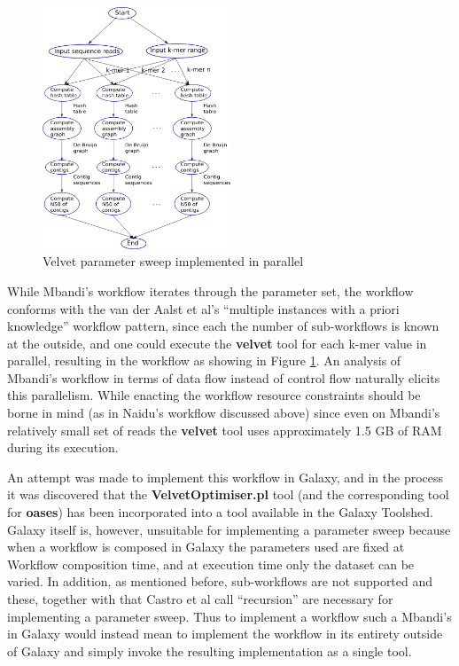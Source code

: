 \documentclass[a4paper,10pt]{scrreprt} \usepackage[utf8]{inputenc}
\begin{document}
\begin{figure}[!htb] \centering
\includegraphics[width=0.5\textwidth]{images/ComputeVelvetAlignments}
\caption{Velvet parameter sweep implemented in parallel}
\label{fig:ComputeVelvetAlignments}
\end{figure}

While Mbandi's workflow iterates through the parameter set, the workflow
conforms with the van der Aalst et al's ``multiple instances with a priori
knowledge'' workflow pattern, since each the number of sub-workflows is known at
the outside, and one could execute the \textbf{velvet} tool for each k-mer value
in parallel, resulting in the workflow as showing in Figure
\ref{fig:ComputeVelvetAlignments}. An analysis of Mbandi's workflow in terms of
data flow instead of control flow naturally elicits this parallelism. While
enacting the workflow resource constraints should be borne in mind (as in
Naidu's workflow discussed above) since even on Mbandi's relatively small set of
reads the \textbf{velvet} tool uses approximately 1.5 GB of RAM during its
execution.

An attempt was made to implement this workflow in Galaxy, and in the process it
was discovered that the \textbf{VelvetOptimiser.pl} tool (and the corresponding
tool for \textbf{oases}) has been incorporated into a tool available in the
Galaxy Toolshed. Galaxy itself is, however, unsuitable for implementing a
parameter sweep because when a workflow is composed in Galaxy the parameters
used are fixed at Workflow composition time, and at execution time only the
dataset can be varied. In addition, as mentioned before, sub-workflows are not
supported and these, together with that Castro et al call ``recursion'' are
necessary for implementing a parameter sweep. Thus to implement a workflow such
a Mbandi's in Galaxy would instead mean to implement the workflow in its
entirety outside of Galaxy and simply invoke the resulting implementation as a
single tool.
\end{document}
